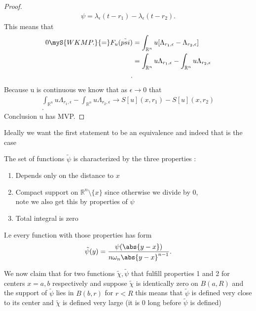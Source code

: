 \begin{proof}
  \begin{align*}
    \psi = \lambda_{\epsilon }(t-r_{1}) - \lambda_{\epsilon }(t-r_2)
  .\end{align*}
  This means that 
  \begin{align*}
    0 \myS{WKMP.}{=} F_u(\tilde{psi}) &= \int_{\mathbb{R}^{n} } u[\Lambda_{r_{1},\epsilon } - \Lambda_{r_{2},\epsilon }]\\
                                      &=  \int_{\mathbb{R}^{n} } u \Lambda_{r_{1},\epsilon } - \int_{\mathbb{R}^{n} } u \Lambda_{r_{2},\epsilon }\\
  .\end{align*}
Because u is continuous we know that as $\epsilon \to  0$ that 
\begin{align*}
  \int_{\mathbb{R}^{n} } u \Lambda_{r_{1},\epsilon } - \int_{\mathbb{R}^{n} } u \Lambda_{r_{2},\epsilon } \to S[u](x,r_{1}) - S[u](x,r_{2})\\ 
.\end{align*}
Conclusion u has MVP.
\end{proof}
Ideally we want the first statement to be an equivalence and indeed that is the case\\[1ex]
\begin{definition}
 The set of functions $\tilde{\psi} $  is characterized by the three properties : 
 \begin{enumerate}
    \item Depends only on the distance to $x$ 
    \item Compact support on $\mathbb{R}^{n}\setminus \{x\}   $ since otherwise we divide by 0,\\
      note we also get this by properties of $\psi$
    \item  Total integral is zero
 \end{enumerate}
 I.e every function with those properties has form 
 \begin{align*}
  \tilde{\psi} (y) = \frac{\psi(\abs{y-x})}{n \omega_n \abs{y-x}^{n-1} }
 .\end{align*}
\end{definition}
We now claim that for two functions $\tilde{\chi } ,\tilde{\psi}  $ that fulfill properties 1 and 2  for centers $x = a,b$ respectively 
and suppose $\tilde{\chi }$ is identically zero on $B(a,R)$ and the support of $\tilde{\psi}$ lies in $B(b,r)$ for $r<R$
this means that $\tilde{\psi}$ is defined very close to its center and $\tilde{\chi } $ is defined very large (it is 0 long before $\tilde{\psi} $ is defined) \\[1ex]
